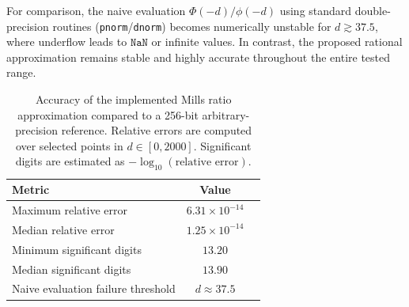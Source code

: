 \documentclass[11pt]{article}
\begin{document}
For comparison, the naive evaluation $ \Phi(-d)/\phi(-d)$ using standard double-precision routines (\texttt{pnorm}/\texttt{dnorm}) becomes numerically unstable for $d \gtrsim 37.5$, where underflow leads to $\texttt{NaN}$ or infinite values. In contrast, the proposed rational approximation remains stable and highly accurate throughout the entire tested range.

\begin{table}[ht]
\centering
\begin{tabular}{lcc}
\hline
Metric & Value \\ 
\hline
Maximum relative error & $6.31 \times 10^{-14}$ \\
Median relative error  & $1.25 \times 10^{-14}$ \\
Minimum significant digits & $13.20$ \\
Median significant digits  & $13.90$ \\
\hline
Naive evaluation failure threshold & $d \approx 37.5$ \\
\hline
\end{tabular}
\caption{Accuracy of the implemented Mills ratio approximation compared to a 256-bit arbitrary-precision reference. Relative errors are computed over selected points in $d \in [0,2000]$. Significant digits are estimated as $-\log_{10}(\text{relative error})$.}
\label{tab:mills_accuracy}
\end{table}




\end{document}
